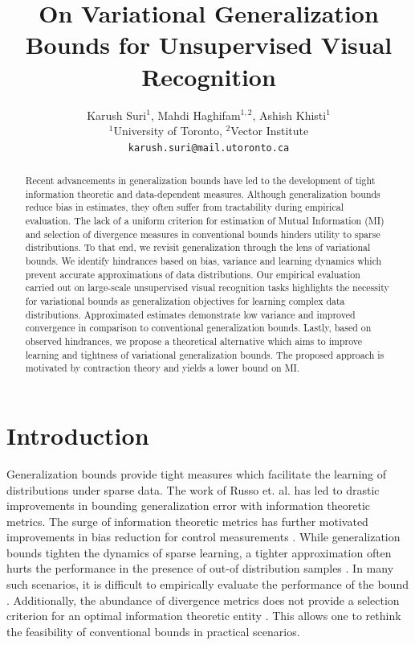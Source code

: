 \documentclass{article}
\title{On Variational Generalization Bounds for Unsupervised Visual Recognition}
\author{
  Karush Suri$^{1}$, Mahdi Haghifam$^{1,2}$, Ashish Khisti$^{1}$\\
   $^{1}$University of Toronto, $^{2}$Vector Institute\\
  \texttt{karush.suri@mail.utoronto.ca}
}
\begin{document}
\maketitle

\begin{abstract}
Recent advancements in generalization bounds have led to the development of tight information theoretic and data-dependent measures. Although generalization bounds reduce bias in estimates, they often suffer from tractability during empirical evaluation. The lack of a uniform criterion for estimation of Mutual Information (MI) and selection of divergence measures in conventional bounds hinders utility to sparse distributions. To that end, we revisit generalization through the lens of variational bounds. We identify hindrances based on bias, variance and learning dynamics which prevent accurate approximations of data distributions. Our empirical evaluation carried out on large-scale unsupervised visual recognition tasks highlights the necessity for variational bounds as generalization objectives for learning complex data distributions. Approximated estimates demonstrate low variance and improved convergence in comparison to conventional generalization bounds. Lastly, based on observed hindrances, we propose a theoretical alternative which aims to improve learning and tightness of variational generalization bounds. The proposed approach is motivated by contraction theory and yields a lower bound on MI.   
\end{abstract}

\section{Introduction}
Generalization bounds provide tight measures which facilitate the learning of distributions under sparse data. The work of Russo et. al. \cite{russo} has led to drastic improvements \cite{xu,negrea} in bounding generalization error with information theoretic metrics. The surge of information theoretic metrics \cite{xu,bu} has further motivated improvements in bias reduction for control measurements \cite{cotnrol}. While generalization bounds tighten the dynamics of sparse learning, a tighter approximation often hurts the performance in the presence of out-of distribution samples \cite{mine}. In many such scenarios, it is difficult to empirically evaluate the performance of the bound \cite{control}. Additionally, the abundance of divergence metrics does not provide a selection criterion for an optimal information theoretic entity \cite{book, measures}. This allows one to rethink the feasibility of conventional bounds in practical scenarios. 
\end{document}
